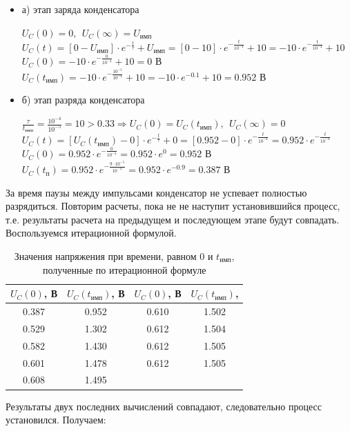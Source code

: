 \documentclass[a4paper,14pt]{extarticle}
\begin{document}
\begin{itemize}
	\item[] а) этап заряда конденсатора

	$U_C(0) = 0,\ \ U_C(\infty) = U_\text{имп}$\\	
	$U_C(t) = [0 - U_\text{имп}] \cdot e^{-\frac{t}{\tau}} + U_\text{имп} = [0 - 10] \cdot e^{-\frac{t}{10^{-4}}} + 10 = -10 \cdot e^{-\frac{t}{10^{-4}}} + 10$\\
	$U_C(0) = -10 \cdot e^{-\frac{0}{10^{-4}}} + 10 = 0 \text{ В}$\\
	$U_C(t_\text{имп}) = -10 \cdot e^{-\frac{10^{-5}}{10^{-4}}} + 10 = -10 \cdot e^{-0.1} + 10 = 0.952 \text{ В}$
	
	\item[] б) этап разряда конденсатора

	$\frac{\tau}{t_\text{имп}} = \frac{10^{-4}}{10^{-5}} = 10 > 0.33 \Rightarrow U_C(0) = U_C(t_\text{имп}),\ \ U_C(\infty) = 0$\\
	$U_C(t) = [U_C(t_\text{имп}) - 0] \cdot e^{-\frac{t}{\tau}} + 0 =  [0.952 - 0] \cdot e^{-\frac{t}{10^{-4}}} = 0.952 \cdot e^{-\frac{t}{10^{-4}}}$\\
	$U_C(0) = 0.952 \cdot e^{-\frac{0}{10^{-4}}} = 0.952 \cdot e^0 = 0.952 \text{ В}$\\
	$U_C(t_\text{п}) = 0.952 \cdot e^{-\frac{9 \cdot 10^{-5}}{10^{-4}}} = 0.952 \cdot e^{-0.9} = 0.387 \text{ В}$
\end{itemize}

За время паузы между импульсами конденсатор не успевает полностью разрядиться. Повторим расчеты, пока не не наступит установившийся процесс, т.е. результаты расчета на предыдущем и последующем этапе будут совпадать. Воспользуемся итерационной формулой.

\begin{table}[H]
\begin{center}
	\captionsetup{justification=centering,margin=2cm}
	\caption{Значения напряжения при времени, равном $0$ и $t_\text{имп}$, полученные по итерационной формуле}
	\def\arraystretch{1.3}
	\def\tabcolsep{25pt}
	\begin{tabular}{|c|c||c|c|}
		\hline 
		$U_C(0)$, В & $U_C(t_\text{имп})$, В & $U_C(0)$, В & $U_C(t_\text{имп})$, \\ 
		\hline 
		0.387 & 0.952 & 0.610 & 1.502 \\
		\hline 
		0.529 & 1.302 & 0.612 & 1.504 \\
		\hline 
		0.582 & 1.430 & 0.612 & 1.505 \\ 
		\hline 
		0.601 & 1.478 & 0.612 & 1.505 \\
		\hline 
		0.608 & 1.495 & & \\
		\hline 
	\end{tabular}
\end{center}
\end{table}
Результаты двух последних вычислений совпадают, следовательно процесс установился. Получаем:
	
\end{document}

